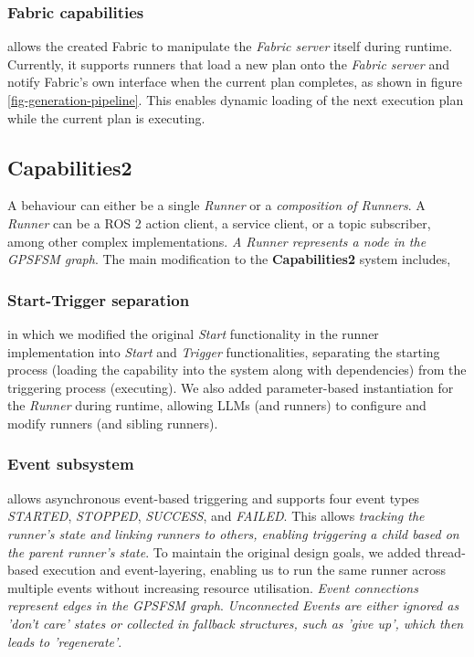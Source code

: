 \documentclass[letterpaper, 10pt, conference]{ieeeconf}      %
\begin{document}
\subsubsection{Fabric capabilities} allows the created Fabric to manipulate the \textit{Fabric server} itself during runtime. Currently, it supports runners that load a new plan onto the \textit{Fabric server} and notify Fabric's own interface when the current plan completes, as shown in figure \ref{fig-generation-pipeline}. This enables dynamic loading of the next execution plan while the current plan is executing.
    
\subsection{Capabilities2}

A behaviour can either be a single \textit{Runner} or a \textit{composition of Runners}. A \textit{Runner} can be a ROS 2 action client, a service client, or a topic subscriber, among other complex implementations. \textit{A Runner represents a node in the GPSFSM graph}. The main modification to the \textbf{Capabilities2} system includes,

\subsubsection{Start-Trigger separation} in which we modified the original \textit{Start} functionality in the runner implementation into \textit{Start} and \textit{Trigger} functionalities, separating the starting process (loading the capability into the system along with dependencies) from the triggering process (executing). We also added parameter-based instantiation for the \textit{Runner} during runtime, allowing LLMs (and runners) to configure and modify runners (and sibling runners).

\subsubsection{Event subsystem} allows asynchronous event-based triggering and supports four event types \textit{STARTED}, \textit{STOPPED}, \textit{SUCCESS}, and \textit{FAILED}. This allows \textit{tracking the runner's state and linking runners to others, enabling triggering a child based on the parent runner's state}. To maintain the original design goals, we added thread-based execution and event-layering, enabling us to run the same runner across multiple events without increasing resource utilisation. \textit{Event connections represent edges in the GPSFSM graph}. \textit{Unconnected Events are either ignored as 'don't care' states or collected in fallback structures, such as 'give up', which then leads to 'regenerate'}.
\end{document}
